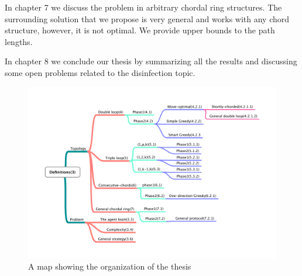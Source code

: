 In chapter 7 we discuss the problem in  arbitrary chordal ring structures. 
The surrounding solution that we propose is very general and works with any chord structure, however, it is not  optimal. We provide upper bounds to the path lengths. 


In chapter 8 we conclude our thesis by summarizing all the results and discussing some open problems related to the \bv disinfection topic.







\begin{figure}[H]
  \centering  
  \includegraphics[width=1\textwidth]{figures/map2.pdf}
  \caption{A map showing the organization of the thesis}
\end{figure}


